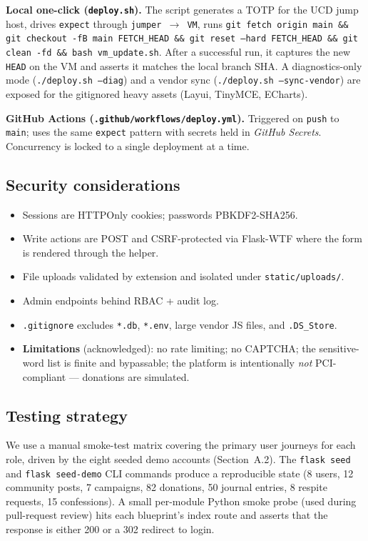 \textbf{Local one-click (\texttt{deploy.sh}).}
The script generates a TOTP for the UCD jump host, drives \texttt{expect}
through \texttt{jumper $\to$ VM}, runs
\texttt{git fetch origin main \&\& git checkout -fB main FETCH\_HEAD
\&\& git reset --hard FETCH\_HEAD \&\& git clean -fd \&\& bash
vm\_update.sh}. After a successful run, it captures the new
\texttt{HEAD} on the VM and asserts it matches the local branch SHA.
A diagnostics-only mode (\texttt{./deploy.sh --diag}) and a vendor sync
(\texttt{./deploy.sh --sync-vendor}) are exposed for the gitignored
heavy assets (Layui, TinyMCE, ECharts).

\textbf{GitHub Actions (\texttt{.github/workflows/deploy.yml}).}
Triggered on \texttt{push} to \texttt{main}; uses the same
\texttt{expect} pattern with secrets held in \emph{GitHub Secrets}.
Concurrency is locked to a single deployment at a time.

\subsection{Security considerations}
\begin{itemize}
  \item Sessions are HTTPOnly cookies; passwords PBKDF2-SHA256.
  \item Write actions are POST and CSRF-protected via Flask-WTF where
        the form is rendered through the helper.
  \item File uploads validated by extension and isolated under
        \texttt{static/uploads/}.
  \item Admin endpoints behind RBAC + audit log.
  \item \texttt{.gitignore} excludes \texttt{*.db}, \texttt{*.env},
        large vendor JS files, and \texttt{.DS\_Store}.
  \item \textbf{Limitations} (acknowledged): no rate limiting; no
        CAPTCHA; the sensitive-word list is finite and bypassable; the
        platform is intentionally \emph{not} PCI-compliant — donations
        are simulated.
\end{itemize}

\subsection{Testing strategy}
We use a manual smoke-test matrix covering the primary user journeys for
each role, driven by the eight seeded demo accounts (Section~A.2). The
\texttt{flask seed} and \texttt{flask seed-demo} CLI commands produce a
reproducible state (8 users, 12 community posts, 7 campaigns, 82
donations, 50 journal entries, 8 respite requests, 15 confessions). A
small per-module Python smoke probe (used during pull-request review)
hits each blueprint's index route and asserts that the response is
either 200 or a 302 redirect to login.

